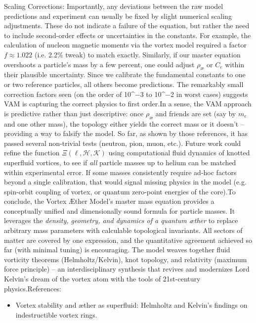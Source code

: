 Scaling Corrections: Importantly, any deviations between the raw model predictions and experiment can usually be fixed by slight numerical scaling adjustments. These do not indicate a failure of the equation, but rather the need to include second-order effects or uncertainties in the constants. For example, the calculation of nucleon magnetic moments via the vortex model required a factor $f\approx1.022$ (i.e. 2.2\% tweak) to match exactly. Similarly, if our master equation overshoots a particle’s mass by a few percent, one could adjust $\rho_{\text{\ae}}$ or $C_e$ within their plausible uncertainty. Since we calibrate the fundamental constants to one or two reference particles, all others become predictions. The remarkably small correction factors seen (on the order of 10^−3 to 10^−2 in worst cases) suggests VAM is capturing the correct physics to first order.In a sense, the VAM approach is predictive rather than just descriptive: once $\rho_{\text{\ae}}$ and friends are set (say by $m_e$ and one other mass), the topology either yields the correct mass or it doesn’t – providing a way to falsify the model. So far, as shown by those references, it has passed several non-trivial tests (neutron, pion, muon, etc.). Future work could refine the function $\Xi(\ell,\mathcal{H},\mathcal{K})$ using computational fluid dynamics of knotted superfluid vortices, to see if \textit{all} particle masses up to helium can be matched within experimental error. If some masses consistently require ad-hoc factors beyond a single calibration, that would signal missing physics in the model (e.g. spin-orbit coupling of vortex, or quantum zero-point energies of the core).To conclude, the Vortex Æther Model’s master mass equation provides a conceptually unified and dimensionally sound formula for particle masses. It leverages the \textit{density, geometry, and dynamics of a quantum æther} to replace arbitrary mass parameters with calculable topological invariants. All sectors of matter are covered by one expression, and the quantitative agreement achieved so far (with minimal tuning) is encouraging. The model weaves together fluid vorticity theorems (Helmholtz/Kelvin), knot topology, and relativity (maximum force principle) – an interdisciplinary synthesis that revives and modernizes Lord Kelvin’s dream of the vortex atom with the tools of 21st-century physics.References:\begin{itemize}

\item
Vortex stability and æther as superfluid: Helmholtz and Kelvin’s findings on indestructible vortex rings.


\end{itemize}
